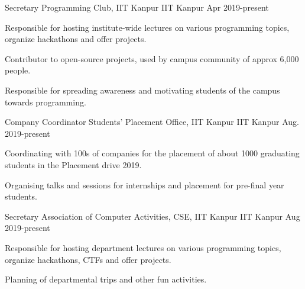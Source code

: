 

\begin{cventries}

  \cventry
    {Secretary} %
    {Programming Club, IIT Kanpur} %
    {IIT Kanpur} %
    {Apr 2019-present} %
    {
      \begin{cvitems} %
        \item {Responsible for hosting institute-wide lectures on various programming topics, organize hackathons and offer projects.}
        \item {Contributor to open-source projects, used by campus community of approx 6,000 people.}
        \item {Responsible for spreading awareness and motivating students of the campus towards programming.}
      \end{cvitems}
    }

  \cventry
    {Company Coordinator} %
    {Students’ Placement Office, IIT Kanpur} %
    {IIT Kanpur} %
    {Aug. 2019-present} %
    {
      \begin{cvitems} %
        \item {Coordinating with 100s of companies for the placement of about 1000 graduating students in the Placement drive 2019.}
        \item {Organising talks and sessions for internships and placement for pre-final year students.}
      \end{cvitems}
    }
    
  \cventry
    {Secretary} %
    {Association of Computer Activities, CSE, IIT Kanpur} %
    {IIT Kanpur} %
    {Aug 2019-present} %
    {
      \begin{cvitems} %
        \item {Responsible for hosting department lectures on various programming topics, organize hackathons, CTFs and offer projects.}
        \item {Planning of departmental trips and other fun activities.}
      \end{cvitems}
    }
    

\end{cventries}
